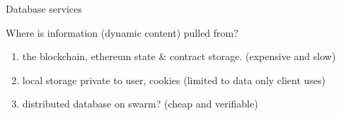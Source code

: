 \begin{subsection}{Database services}


\begin{frame}
\begin{block}{Where is information (dynamic content) pulled from?}
\begin{enumerate}
\item the blockchain, ethereum state \& contract storage. (expensive and slow)
\item local storage private to user, cookies (limited to data only client uses)
\item distributed database on swarm? (cheap and verifiable)
\end{enumerate}
\end{block}
\end{frame}


\end{subsection}
